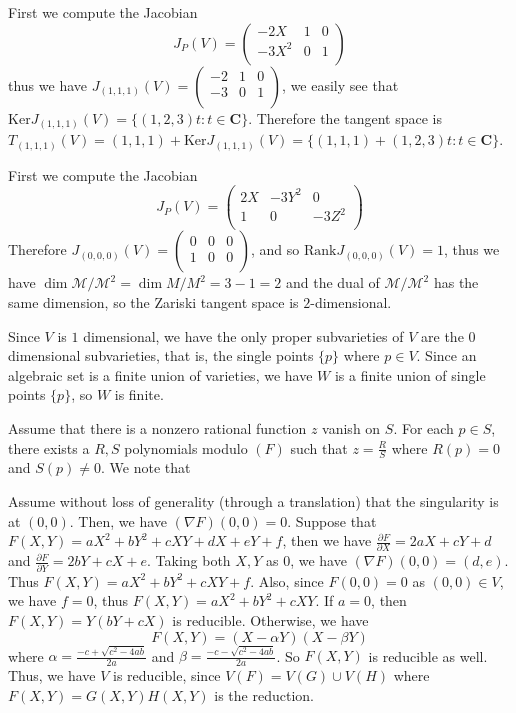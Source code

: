 \documentclass[11pt]{book}
\begin{document}
\begin{problem}
First we compute the Jacobian
\[J_P(V)=\begin{pmatrix}
-2X&1&0\\
-3X^2&0&1\\
\end{pmatrix}\]
thus we have $J_{(1,1,1)}(V)=\begin{pmatrix}-2&1&0\\-3&0&1\\\end{pmatrix}$, we easily see that $\mathrm{Ker}J_{(1,1,1)}(V)=\{(1,2,3)t:t\in\mathbf C\}$. Therefore the tangent space is $T_{(1,1,1)}(V)=(1,1,1)+\mathrm{Ker}J_{(1,1,1)}(V)=\{(1,1,1)+(1,2,3)t:t\in\mathbf C\}$.
\end{problem}
\begin{problem}
First we compute the Jacobian 
\[J_{P}(V)=\begin{pmatrix}
2X&-3Y^2&0\\
1&0&-3Z^2\\
\end{pmatrix}\]
Therefore $J_{(0,0,0)}(V)=\begin{pmatrix}
0&0&0\\
1&0&0\\
\end{pmatrix}$, and so $\mathrm{Rank}J_{(0,0,0)}(V)=1$, thus we have $\dim \mathcal{M}/\mathcal{M}^2=\dim M/M^2=3-1=2$ and the dual of $\mathcal{M}/\mathcal{M}^2$ has the same dimension, so the Zariski tangent space is $2$-dimensional.
\end{problem}
\begin{problem}Since $V$ is $1$ dimensional, we have the only proper subvarieties of $V$ are the $0$ dimensional subvarieties, that is, the single points $\{p\}$ where $p\in V$. Since an algebraic set is a finite union of varieties, we have $W$ is a finite union of single points $\{p\}$, so $W$ is finite.
\end{problem}
\begin{problem}
Assume that there is a nonzero rational function $z$ vanish on $S$. For each $p\in S$, there exists a $R,S$ polynomials modulo $(F)$ such that $z=\frac{R}{S}$ where $R(p)=0$ and $S(p)\ne 0$. We note that
\end{problem}
\begin{problem}
Assume without loss of generality (through a translation) that the singularity is at $(0,0)$. Then, we have $(\nabla F)(0,0)= 0$. Suppose that $F(X,Y)=aX^2+bY^2+cXY+dX+eY+f$, then we have $\frac{\partial F}{\partial X}=2aX+cY+d$ and $\frac{\partial F}{\partial Y}=2bY+cX+e$. Taking both $X,Y$ as $0$, we have $(\nabla F)(0,0)=(d,e)$. Thus $F(X,Y)=aX^2+bY^2+cXY+f$. Also, since $F(0,0)=0$ as $(0,0)\in V$, we have $f=0$, thus $F(X,Y)=aX^2+bY^2+cXY$. If $a=0$, then $F(X,Y)=Y(bY+cX)$ is reducible. Otherwise, we have 
\[F(X,Y)=\left(X-\alpha Y\right)\left(X-\beta Y\right)\]
where $\alpha=\frac{-c+\sqrt{c^2-4ab}}{2a}$ and $\beta=\frac{-c-\sqrt{c^2-4ab}}{2a}$. So $F(X,Y)$ is reducible as well. Thus, we have $V$ is reducible, since $V(F)=V(G)\cup V(H)$ where $F(X,Y)=G(X,Y)H(X,Y)$ is the reduction.
\end{problem}
\end{document}
